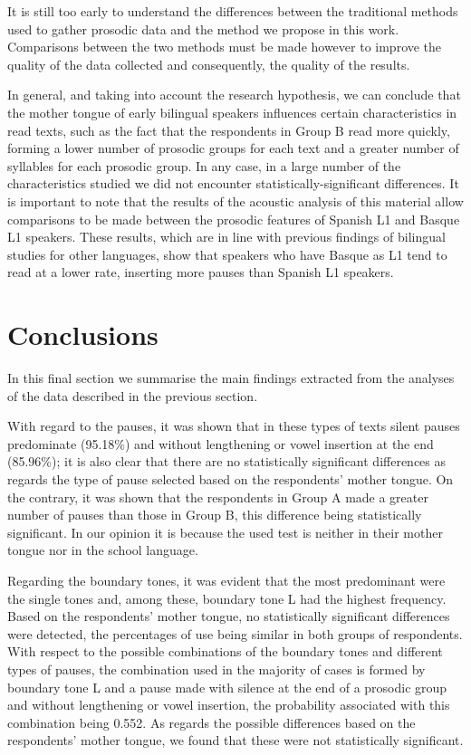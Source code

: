 \documentclass[output=paper]{langsci/langscibook}
\begin{document}
It is still too early to understand the differences between the traditional methods used to gather prosodic data and the method we propose in this work. Comparisons between the two methods must be made however to improve the quality of the data collected and consequently, the quality of the results.

In general, and taking into account the research hypothesis, we can conclude that the mother tongue of early bilingual speakers influences certain characteristics in read texts, such as the fact that the respondents in Group B read more quickly, forming a lower number of prosodic groups for each text and a greater number of syllables for each prosodic group. In any case, in a large number of the characteristics studied we did not encounter statistically-significant differences. It is important to note that the results of the acoustic analysis of this material allow comparisons to be made between the prosodic features of Spanish L1 and Basque L1 speakers. These results, which are in line with previous findings of bilingual studies for other languages, show that speakers who have Basque as L1 tend to read at a lower rate, inserting more pauses than Spanish L1 speakers.


\section{Conclusions}

  In this final section we summarise the main findings extracted from the analyses of the data described in the previous section.

  With regard to the pauses, it was shown that in these types of texts silent pauses predominate (95.18\%) and without lengthening or vowel insertion at the end (85.96\%); it is also clear that there are no statistically significant differences as regards the type of pause selected based on the respondents’ mother tongue. On the contrary, it was shown that the respondents in Group A made a greater number of pauses than those in Group B, this difference being statistically significant. In our opinion it is because the used test is neither in their mother tongue nor in the school language.

  Regarding the boundary tones, it was evident that the most predominant were the single tones and, among these, boundary tone L had the highest frequency. Based on the respondents’ mother tongue, no statistically significant differences were detected, the percentages of use being similar in both groups of respondents. With respect to the possible combinations of the boundary tones and different types of pauses, the combination used in the majority of cases is formed by boundary tone L and a pause made with silence at the end of a prosodic group and without lengthening or vowel insertion, the probability associated with this combination being 0.552. As regards the possible differences based on the respondents’ mother tongue, we found that these were not statistically significant.
\end{document}
